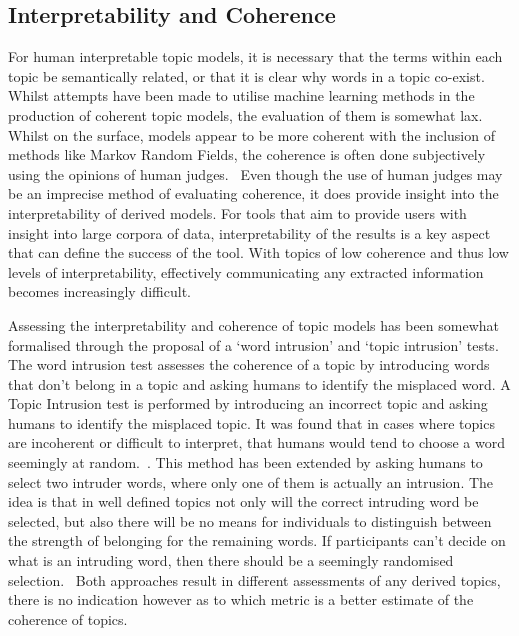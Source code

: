 \documentclass[10pt]{report}
\begin{document}
\subsection{Interpretability and Coherence}
For human interpretable topic models, it is necessary that the terms within each topic be semantically related, or that it is clear why words in a topic co-exist. Whilst attempts have been made to utilise machine learning methods in the production of coherent topic models, the evaluation of them is somewhat lax. Whilst on the surface, models appear to be more coherent with the inclusion of methods like Markov Random Fields, the coherence is often done subjectively using the opinions of human judges.~\cite{Xie2015-wv} Even though the use of human judges may be an imprecise method of evaluating coherence, it does provide insight into the interpretability of derived models. For tools that aim to provide users with insight into large corpora of data, interpretability of the results is a key aspect that can define the success of the tool. With topics of low coherence and thus low levels of interpretability, effectively communicating any extracted information becomes increasingly difficult.

Assessing the interpretability and coherence of topic models has been somewhat formalised through the proposal of a ‘word intrusion’ and ‘topic intrusion’ tests. The word intrusion test assesses the coherence of a topic by introducing words that don’t belong in a topic and asking humans to identify the misplaced word. A Topic Intrusion test is performed by introducing an incorrect topic and asking humans to identify the misplaced topic. It was found that in cases where topics are incoherent or difficult to interpret, that humans would tend to choose a word seemingly at random.~\cite{Chang2009-jr}. This method has been extended by asking humans to select two intruder words, where only one of them is actually an intrusion. The idea is that in well defined topics not only will the correct intruding word be selected, but also there will be no means for individuals to distinguish between the strength of belonging for the remaining words. If participants can't decide on what is an intruding word, then there should be a seemingly randomised selection.~\cite{Morstatter2016-co} Both approaches result in different assessments of any derived topics, there is no indication however as to which metric is a better estimate of the coherence of topics.
\end{document}
